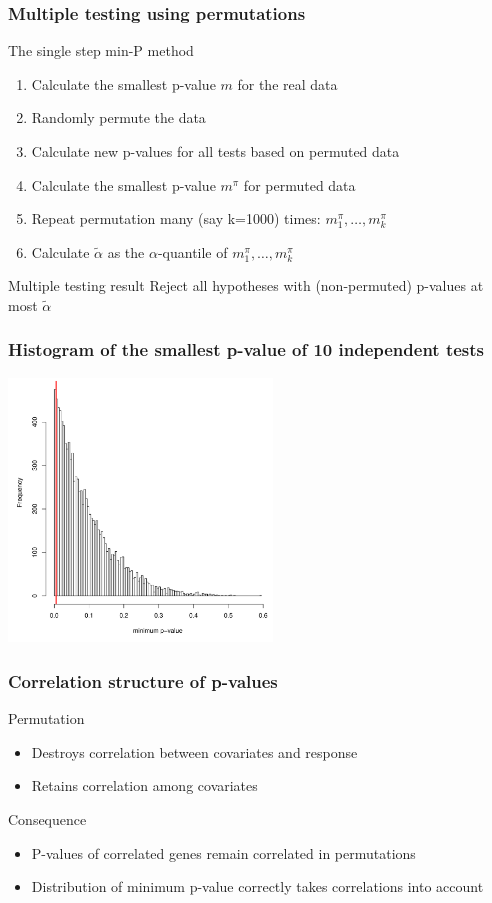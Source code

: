 \documentclass[compress]{beamer}
\newcommand{\bb}[1]{\begin{block}{#1}}
\newcommand{\eb}{\end{block}}
\newcommand{\bi}{\begin {itemize}}
\newcommand{\ei}{\end{itemize}}
\newcommand{\be}{\begin {enumerate}}
\newcommand{\ee}{\end{enumerate}}
\newcommand{\bfr}[1]{\begin{frame} \frametitle{#1}}
\begin{document}
\bfr{Multiple testing using permutations}
  \bb{The single step min-P method}
    \be
      \item Calculate the smallest p-value $m$ for the real data
      \item Randomly permute the data
      \item Calculate new p-values for all tests based on permuted data
      \item Calculate the smallest p-value $m^\pi$ for permuted data
      \item Repeat permutation many (say k=1000) times: $m^\pi_1, \ldots, m^\pi_k$
      \item Calculate $\tilde\alpha$ as the $\alpha$-quantile of $m^\pi_1, \ldots, m^\pi_k$
    \ee
  \eb
  \bb{Multiple testing result}
    Reject all hypotheses with (non-permuted) p-values at most $\tilde\alpha$
  \eb
\end{frame}


\bfr{Histogram of the smallest p-value of 10 independent tests}
\includegraphics[height=7cm]{plaatjes/minp}
\end{frame}

\bfr{Correlation structure of p-values}
  \bb{Permutation}
    \bi
      \item Destroys correlation between covariates and response
      \item Retains correlation among covariates
    \ei
  \eb
  \bb{Consequence}
    \bi
      \item P-values of correlated genes remain correlated in permutations
      \item Distribution of minimum p-value correctly takes correlations into account
    \ei
  \eb
\end{frame}
\end{document}
